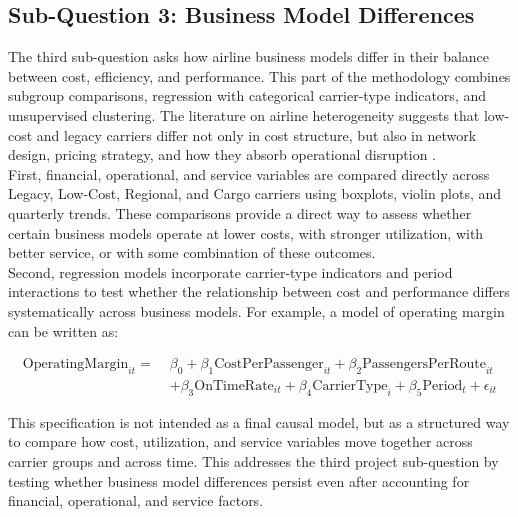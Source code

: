 \documentclass[11pt, letterpaper]{article}
\begin{document}
\subsection{Sub-Question 3: Business Model Differences}
The third sub-question asks how airline business models differ in their balance between cost, efficiency, and performance. This part of the methodology combines subgroup comparisons, regression with categorical carrier-type indicators, and unsupervised clustering. The literature on airline heterogeneity suggests that low-cost and legacy carriers differ not only in cost structure, but also in network design, pricing strategy, and how they absorb operational disruption \cite{fontanet2022, gillen2004, li2025, nguyen2022}.\\
\indent First, financial, operational, and service variables are compared directly across Legacy, Low-Cost, Regional, and Cargo carriers using boxplots, violin plots, and quarterly trends. These comparisons provide a direct way to assess whether certain business models operate at lower costs, with stronger utilization, with better service, or with some combination of these outcomes.\\
\indent Second, regression models incorporate carrier-type indicators and period interactions to test whether the relationship between cost and performance differs systematically across business models. For example, a model of operating margin can be written as:

\begin{align*}
\text{OperatingMargin}_{it} =\;& \beta_0
+ \beta_1 \text{CostPerPassenger}_{it}
+ \beta_2 \text{PassengersPerRoute}_{it} \\
&+ \beta_3 \text{OnTimeRate}_{it}
+ \beta_4 \text{CarrierType}_{i}
+ \beta_5 \text{Period}_{t}
+ \epsilon_{it}
\end{align*}

This specification is not intended as a final causal model, but as a structured way to compare how cost, utilization, and service variables move together across carrier groups and across time. This addresses the third project sub-question by testing whether business model differences persist even after accounting for financial, operational, and service factors.
\end{document}
